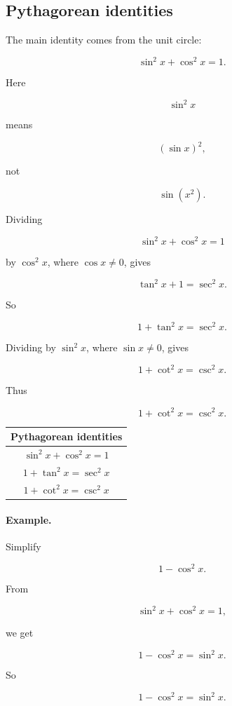 \subsection{Pythagorean identities}
\label{appsubsec:pythagorean-identities}

The main identity comes from the unit circle:

\[
\boxed{
\sin^2 x+\cos^2 x=1.
}
\]

Here

\[
\sin^2 x
\]

means

\[
(\sin x)^2,
\]

not

\[
\sin(x^2).
\]

Dividing

\[
\sin^2 x+\cos^2 x=1
\]

by \(\cos^2 x\), where \(\cos x\neq0\), gives

\[
\tan^2 x+1=\sec^2 x.
\]

So

\[
\boxed{
1+\tan^2 x=\sec^2 x.
}
\]

Dividing by \(\sin^2 x\), where \(\sin x\neq0\), gives

\[
1+\cot^2 x=\csc^2 x.
\]

Thus

\[
\boxed{
1+\cot^2 x=\csc^2 x.
}
\]

\begin{center}
\renewcommand{\arraystretch}{1.7}
\begin{tabular}{c}
\textbf{Pythagorean identities} \\ \hline
\(\sin^2 x+\cos^2 x=1\) \\[3pt]
\(1+\tan^2 x=\sec^2 x\) \\[3pt]
\(1+\cot^2 x=\csc^2 x\)
\end{tabular}
\end{center}

\paragraph{Example.}
Simplify

\[
1-\cos^2 x.
\]

From

\[
\sin^2 x+\cos^2 x=1,
\]

we get

\[
1-\cos^2 x=\sin^2 x.
\]

So

\[
\boxed{
1-\cos^2 x=\sin^2 x.
}
\]

